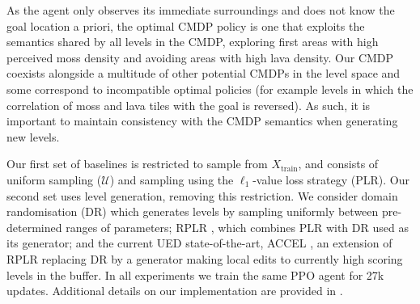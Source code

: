 \documentclass{article}
\theoremstyle{plain}
\theoremstyle{definition}
\theoremstyle{remark}
\begin{document}
As the agent only observes its immediate surroundings and does not know the goal location a priori, the optimal CMDP policy is one that exploits the semantics shared by all levels in the CMDP, exploring first areas with high perceived moss density and avoiding areas with high lava density. Our CMDP coexists alongside a multitude of other potential CMDPs in the level space and some correspond to incompatible optimal policies (for example levels in which the correlation of moss and lava tiles with the goal is reversed). As such, it is important to maintain consistency with the CMDP semantics when generating new levels.

Our first set of baselines is restricted to sample from $X_\text{train}$, and consists of uniform sampling ($\mathcal{U}$) and sampling using the $\ell_1$-value loss strategy (PLR). Our second set uses level generation, removing this restriction. We consider domain randomisation (DR) \citep{DR} which generates levels by sampling uniformly between pre-determined ranges of parameters; RPLR \citep{Robust-PLR}, which combines PLR with DR used as its generator; and the current UED state-of-the-art, ACCEL \citep{ACCEL}, an extension of RPLR replacing DR by a generator making local edits to currently high scoring levels in the buffer. %
In all experiments we train the same PPO \citep{PPO} agent for 27k updates. Additional details on our implementation are provided in .
\end{document}
